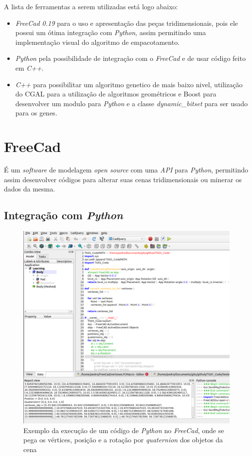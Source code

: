 
A lista de ferramentas a serem utilizadas está logo abaixo:

\begin{itemize}
    \item \textit{FreeCad 0.19} para o uso e apresentação das peças tridimensionais, pois ele possui um ótima integração com \textit{Python}, assim permitindo uma implementação visual do algoritmo de empacotamento.
    \item \textit{Python} pela possibilidade de integração com o \textit{FreeCad} e de usar código feito em \textit{C++}.
    \item \textit{C++} para possibilitar um algoritmo genetico de mais baixo nivel, utilização do CGAL para a utilização de algoritmos geométricos e Boost para desenvolver um modulo para \textit{Python} e a classe \textit{dynamic\_bitset} para ser usado para os genes.
\end{itemize}

\section{FreeCad}\label{cap:tools:sec:freecad}

\cite{FreeCad} É um \textit{software} de modelagem \textit{open source} com uma \textit{API} para \textit{Python}, permitindo assim desenvolver códigos para alterar suas cenas tridimensionais ou minerar os dados da mesma.

\subsection{Integração com \textit{Python}}
\begin{figure}[H]
    \centering
    \includegraphics[scale=0.3]{Capitulos/Cap02_figs/FreeCad_Python.png}
    \caption{Exemplo da execução de um código de \textit{Python} no \textit{FreeCad}, onde se pega os vértices, posição e a rotação por \textit{quaternion} dos objetos da cena}
    \label{fig:Cap02_FreeCad_Python_01}
\end{figure}

